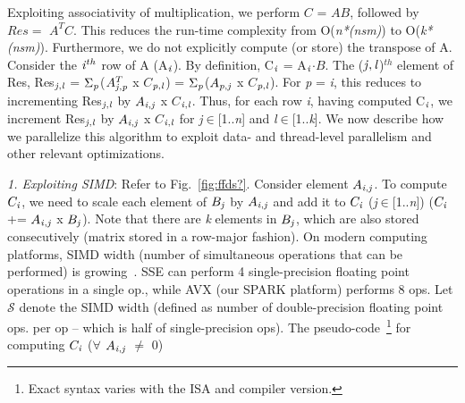     Exploiting associativity of multiplication, we perform $C$ = $AB$, 
    followed by $Res =$ $A^TC$. This reduces the run-time complexity from
    O({\it{n*(nsm)}}) to O({\it{k*(nsm)}}). Furthermore, we do not
    explicitly compute (or store) the transpose of A.  Consider the
    ${\it{i}}^{th}$ row of A (A$_{\it{i}}$). 
    By definition, 
    C$_{\it{i}}$ %
    = A$_{\it{i}}$$\cdot$$B$.
     The (${\it{j}},{\it{l}}$)$^{th}$ element of Res,
    Res$_{{\it{j}},{\it{l}}}$ =
    $\Sigma_{\it{p}}$($A^T_{{\it{j}},{\it{p}}}$ x $C$$_{{\it{p}},{\it{l}}}$) = 
    $\Sigma_{\it{p}}$($A_{{\it{p}},{\it{j}}}$ x
    $C$$_{{\it{p}},{\it{l}}}$).
    For {\it{p}} = {\it{i}}, this reduces to incrementing
    Res$_{{\it{j}},{\it{l}}}$ by $A_{{\it{i}},{\it{j}}}$ x
    $C$$_{{\it{i}},{\it{l}}}$. 
    Thus, for each row {\it{i}}, 
    having computed C$_{\it{i}}$, we
    increment Res$_{{\it{j}},{\it{l}}}$ 
    by $A_{{\it{i}},{\it{j}}}$ x $C$$_{{\it{i}},{\it{l}}}$
    for {\it{j}}$\in$[1..{\it{n}}] and {\it{l}}$\in$[1..{\it{k}}].
     We now describe how we parallelize this algorithm to exploit
     data- and thread-level parallelism and other relevant
     optimizations.

     \vspace*{0.1in}
     {\it{1. Exploiting SIMD}}: Refer to Fig.~\ref{fig:ffds?}. 
     Consider element $A_{{\it{i}},{\it{j}}}$. To compute
     $C_{\it{i}}$, we need to scale each element of
     $B_{{\it{j}}}$ by  $A_{{\it{i}},{\it{j}}}$ and add it to
     $C_{\it{i}}$ ({\it{j}}$\in$[1..{\it{n}}]) ($C_{\it{i}}$ +=
     $A_{{\it{i}},{\it{j}}}$ x $B_{{\it{j}}}$). Note that there are
     {\it{k}} elements in $B_{{\it{j}}}$, which are also stored
     consecutively (matrix stored in a row-major fashion).
     On modern computing platforms, SIMD width (number of simultaneous
     operations that can be performed) is
     growing~\cite{intel1?,intel2}. SSE can perform 4
     single-precision floating point operations in a single op., while
     AVX (our SPARK platform) performs 8 ops. Let $\mathcal{S}$ denote the SIMD width
     (defined as number of double-precision floating point ops. per op
     -- which is half of single-precision ops).
     The pseudo-code~\footnote{Exact syntax varies with the ISA and
     compiler version.} for computing $C_{\it{i}}$ ($\forall$ $A_{{\it{i}},{\it{j}}}$ $\neq$ 0)
     \vspace*{0.05in}

